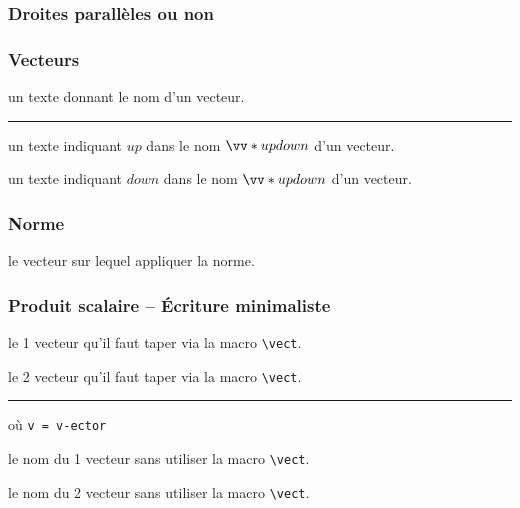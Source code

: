 \documentclass[12pt,a4paper]{article}
\newcommand\env[1]{\texttt{#1}}
\newcommand\macro[1]{\env{\textbackslash{}#1}}
\theoremstyle{definition}
\newcommand\separation{
	\medskip
	\hfill\rule{0.5\textwidth}{0.75pt}\hfill
	\medskip
}
\newcommand\extraspace{
	\vspace{0.25em}
}
\newcommand\mwhyprefix[2]{%
	\texttt{#1 = #1-#2}%
}
\begin{document}



\subsubsection{Droites parallèles ou non}



\extraspace


\subsubsection{Vecteurs}


\IDarg{} un texte donnant le nom d'un vecteur.


\separation



 un texte indiquant $up$ dans le nom $\vect*{up}{down}$ d'un vecteur.

 un texte indiquant $down$ dans le nom $\vect*{up}{down}$ d'un vecteur.
\subsubsection{Norme}



\IDarg{} le vecteur sur lequel appliquer la norme.
\subsubsection{Produit scalaire -- Écriture minimaliste}


 le 1\ier{} vecteur qu'il faut taper via la macro \macro{vect}.

 le 2\ieme{} vecteur qu'il faut taper via la macro \macro{vect}.


\separation


 où \quad \mwhyprefix{v}{ector}

 le nom du 1\ier{} vecteur sans utiliser la macro \macro{vect}.

 le nom du 2\ieme{} vecteur sans utiliser la macro \macro{vect}.
\end{document}
